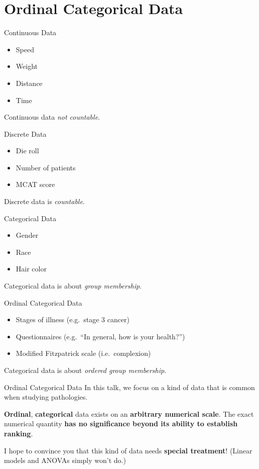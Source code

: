 \documentclass{beamer}
\begin{document}
\section{Ordinal Categorical Data}
\begin{frame}{Continuous Data}
\begin{itemize}
\item Speed
\item Weight
\item Distance
\item Time
\end{itemize}
Continuous data \emph{not countable}.
\end{frame}

\begin{frame}{Discrete Data}
\begin{itemize}
\item Die roll
\item Number of patients
\item MCAT score
\end{itemize}
\vspace{10px}
Discrete data is \emph{countable}.
\end{frame}

\begin{frame}{Categorical Data}
\begin{itemize}
\item Gender
\item Race
\item Hair color
\end{itemize}
Categorical data is about \emph{group membership}.
\end{frame}

\begin{frame}{Ordinal Categorical Data}
\begin{itemize}
\item Stages of illness (e.g.\ stage 3 cancer)
\item Questionnaires (e.g.\ ``In general, how is your health?'')
\item Modified Fitzpatrick scale (i.e.\ complexion)
\end{itemize}
Categorical data is about \emph{ordered group membership}.
\end{frame}

\begin{frame}{Ordinal Categorical Data}
In this talk, we focus on a kind of data that is common when studying pathologies.

\vspace{20px}

\textbf{Ordinal}, \textbf{categorical} data exists on an \textbf{arbitrary numerical scale}. The exact numerical quantity \textbf{has no significance beyond its ability to establish ranking}.

\vspace{20px}

I hope to convince you that this kind of data needs \textbf{special treatment}! (Linear models and ANOVAs simply won't do.)
\end{frame}
\end{document}
